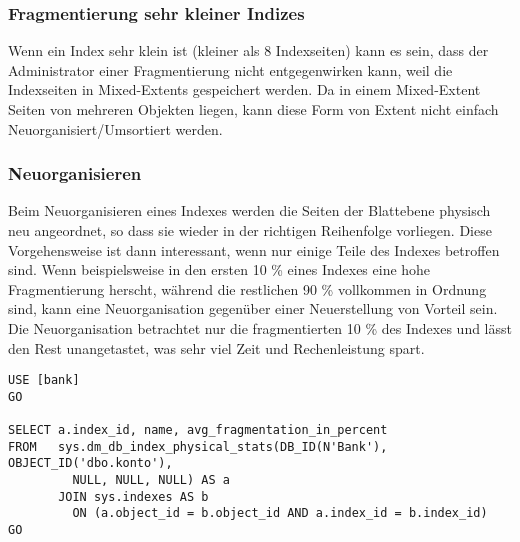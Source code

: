         \subsubsection{Fragmentierung sehr kleiner Indizes}
          Wenn ein Index sehr klein ist (kleiner als 8 Indexseiten) kann es
          sein, dass der Administrator einer Fragmentierung nicht entgegenwirken
          kann, weil die Indexseiten in Mixed-Extents gespeichert werden. Da in
          einem Mixed-Extent Seiten von mehreren Objekten liegen, kann diese
          Form von Extent nicht einfach Neuorganisiert/Umsortiert werden.
        \subsubsection{Neuorganisieren}
          Beim Neuorganisieren eines Indexes werden die Seiten der Blattebene
          physisch neu angeordnet, so dass sie wieder in der richtigen
          Reihenfolge vorliegen. Diese Vorgehensweise ist dann interessant, wenn
          nur einige Teile des Indexes betroffen sind. Wenn beispielsweise in
          den ersten 10 \% eines Indexes eine hohe Fragmentierung herscht,
          während die restlichen 90 \% vollkommen in Ordnung sind, kann eine
          Neuorganisation gegenüber einer Neuerstellung von Vorteil sein. Die
          Neuorganisation betrachtet nur die fragmentierten 10 \% des Indexes
          und lässt den Rest unangetastet, was sehr viel Zeit und Rechenleistung
          spart.
          \begin{lstlisting}[language=ms_sql, caption={Den
          Fragmentierungsgrad eines Indizes feststellen}, label=admin05_12]
USE [bank]
GO

SELECT a.index_id, name, avg_fragmentation_in_percent
FROM   sys.dm_db_index_physical_stats(DB_ID(N'Bank'), OBJECT_ID('dbo.konto'), 
         NULL, NULL, NULL) AS a
       JOIN sys.indexes AS b
         ON (a.object_id = b.object_id AND a.index_id = b.index_id)
GO
          \end{lstlisting}

